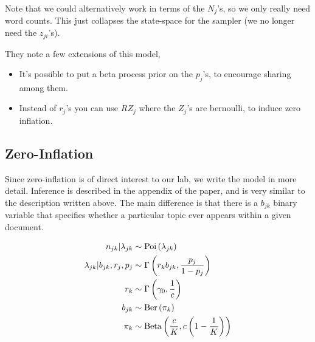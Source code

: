 \documentclass{article}
\begin{document}
Note that we could alternatively work in terms of the $N_{j}$'s, so we only
really need word counts. This just collapses the state-space for the sampler (we
no longer need the $z_{ji}$'s).

They note a few extensions of this model,
\begin{itemize}
\item It's possible to put a beta process prior on the $p_{j}$'s, to encourage sharing among them.
  \item Instead of $r_{j}$'s you can use $RZ_{j}$ where the $Z_{j}$'s are
    bernoulli, to induce zero inflation.
\end{itemize}

\subsection{Zero-Inflation}

Since zero-inflation is of direct interest to our lab, we write the model in
more detail. Inference is described in the appendix of the paper, and is very
similar to the description written above. The main difference is that there is a
$b_{jk}$ binary variable that specifies whether a particular topic ever appears
within a given document.

\begin{align}
  n_{jk} \vert \lambda_{jk} &\sim \textnormal{Poi}\left(\lambda_{jk}\right) \\
  \lambda_{jk} \vert b_{jk}, r_{j}, p_{j} &\sim \Gamma\left(r_{k}b_{jk}, \frac{p_{j}}{1 - p_{j}}\right) \\
  r_{k} &\sim \Gamma\left(\gamma_{0}, \frac{1}{c}\right) \\
  b_{jk} &\sim \textnormal{Ber}\left(\pi_{k}\right) \\
  \pi_{k} &\sim \textnormal{Beta}\left(\frac{c}{K}, c\left(1 - \frac{1}{K}\right)\right)
\end{align}



\end{document}
